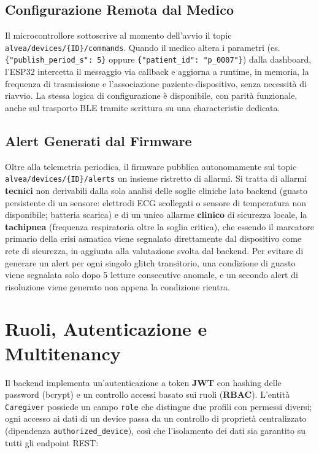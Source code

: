 \documentclass[11pt,a4paper]{article}
\begin{document}
\subsection{Configurazione Remota dal Medico}
Il microcontrollore sottoscrive al momento dell'avvio il topic \texttt{alvea/devices/\{ID\}/commands}. Quando il medico altera i parametri (es. \texttt{\{"publish\_period\_s": 5\}} oppure \texttt{\{"patient\_id": "p\_0007"\}}) dalla dashboard, l'ESP32 intercetta il messaggio via callback e aggiorna a runtime, in memoria, la frequenza di trasmissione e l'associazione paziente-dispositivo, senza necessità di riavvio. La stessa logica di configurazione è disponibile, con parità funzionale, anche sul trasporto BLE tramite scrittura su una characteristic dedicata.

\subsection{Alert Generati dal Firmware}
Oltre alla telemetria periodica, il firmware pubblica autonomamente sul topic \texttt{alvea/devices/\{ID\}/alerts} un insieme ristretto di allarmi. Si tratta di allarmi \textbf{tecnici} non derivabili dalla sola analisi delle soglie cliniche lato backend (guasto persistente di un sensore: elettrodi ECG scollegati o sensore di temperatura non disponibile; batteria scarica) e di un unico allarme \textbf{clinico} di sicurezza locale, la \textbf{tachipnea} (frequenza respiratoria oltre la soglia critica), che essendo il marcatore primario della crisi asmatica viene segnalato direttamente dal dispositivo come rete di sicurezza, in aggiunta alla valutazione svolta dal backend. Per evitare di generare un alert per ogni singolo glitch transitorio, una condizione di guasto viene segnalata solo dopo 5 letture consecutive anomale, e un secondo alert di risoluzione viene generato non appena la condizione rientra.

\newpage
\section{Ruoli, Autenticazione e Multitenancy}

Il backend implementa un'autenticazione a token \textbf{JWT} con hashing delle password (bcrypt) e un controllo accessi basato sui ruoli (\textbf{RBAC}). L'entità \texttt{Caregiver} possiede un campo \texttt{role} che distingue due profili con permessi diversi; ogni accesso ai dati di un device passa da un controllo di proprietà centralizzato (dipendenza \texttt{authorized\_device}), così che l'isolamento dei dati sia garantito su tutti gli endpoint REST:
\end{document}
